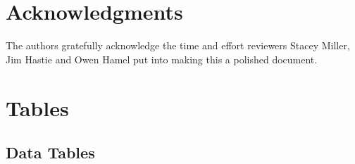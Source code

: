 \documentclass[12pt,]{article}
\begin{document}
\hypertarget{acknowledgments}{%
\section{Acknowledgments}\label{acknowledgments}}

The authors gratefully acknowledge the time and effort reviewers Stacey
Miller, Jim Hastie and Owen Hamel put into making this a polished
document.

\newpage
\FloatBarrier
\newpage

\hypertarget{tables}{%
\section{Tables}\label{tables}}

\hypertarget{data-tables}{%
\subsection{Data Tables}\label{data-tables}}
\end{document}
